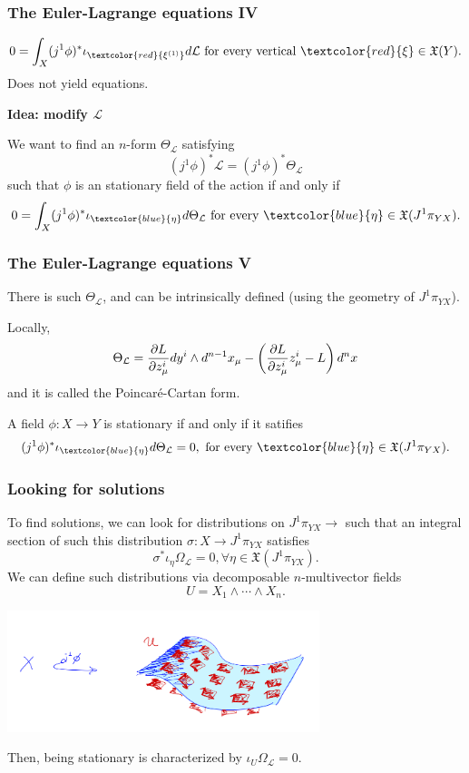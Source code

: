 \begin{frame}
    \frametitle{The Euler-Lagrange equations IV}
    $$0 = \int_X (j^1 \phi)^\ast  \iota_{ \textcolor{red}{\xi^{(1)}}}
     d \mathcal{L}\,\, \text{for every vertical } \textcolor{red}{\xi} \in \mathfrak{X}(Y).$$
    \alert{Does not yield equations.}
    \begin{center}
        {\large \bf \alert{Idea}: modify $\mathcal{L}$}
    \end{center}
    We want to find an $n$-form $\Theta_\mathcal{L}$ satisfying $$(j^1 \phi)^\ast \mathcal{L} = (j^1 \phi)^\ast \Theta_\mathcal{L}$$
    such that $\phi$ is an stationary field of the action if and only if
    $$0 = \int_X (j^1 \phi)^\ast  \iota_{ \textcolor{blue}{\eta}}
     d \Theta_\mathcal{L}\,\, \text{for every } \textcolor{blue}{\eta} \in \mathfrak{X}(J^1 \pi_{YX}).$$
\end{frame}

\begin{frame}
    \frametitle{The Euler-Lagrange equations V}
    \begin{proposition} There is such $\Theta_\mathcal{L}$, and can be intrinsically defined (using the geometry of $J^1 \pi_{YX}$).
    \end{proposition}
    Locally, 
    $$\Theta_\mathcal{L} =  \pdv{L}{z^i_\mu}  dy^i \wedge d^{n-1}x_\mu - \left( \pdv{L}{z^i_\mu}z^i_\mu - L \right) d^n x$$
    and it is called \alert{the Poincaré-Cartan form}.

    \begin{corollary}
        A field $\phi:X \rightarrow Y$ is stationary if and only if it satifies
        $$(j^1 \phi)^\ast \iota_{\textcolor{blue}{\eta}} d\Theta_\mathcal{L} = 0, \,\,\text{for every } \textcolor{blue}{\eta} \in \mathfrak{X}(J^1 \pi_{YX}).$$
    \end{corollary}
\end{frame}

\begin{frame}
    \frametitle{Looking for solutions}
    To find solutions, we can look for distributions on $J^1 \pi_{YX} \rightarrow$ such that an integral
    section of such this distribution $\sigma: X \rightarrow J^1 \pi_{YX}$ satisfies $$\sigma^\ast \iota_\eta \Omega_\mathcal{L} = 0, \forall \eta \in \mathfrak{X} (J^1 \pi_{YX}).$$
    We can define such distributions via decomposable $n$-multivector fields $$U = X_1 \wedge \cdots \wedge X_n.$$
    \begin{center}
        \includegraphics[height = 100pt]{Images/Multivector_multisymplectic.PNG}
    \end{center} 
    Then, being stationary is characterized by $\iota_U \Omega_\mathcal{L} = 0$.
\end{frame}

